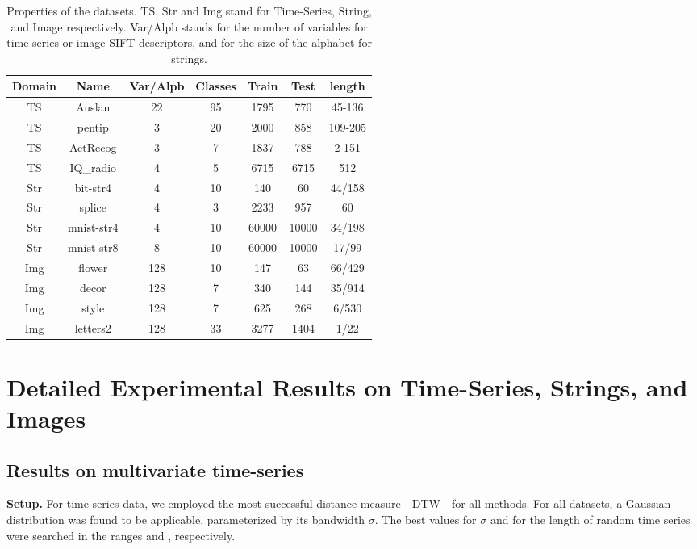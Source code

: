 \documentclass{article}
\newcommand{\1}{\mathbf{1}}
\begin{document}
\begin{table}[htbp]
\centering
\small
\caption{Properties of the datasets. TS, Str and Img stand for Time-Series, String, and Image respectively. Var/Alpb stands for the number of variables for time-series or image SIFT-descriptors, and for the size of the alphabet for strings. } 
\label{tb:info of datasets}
\vspace{-2mm}
\begin{center}
    \begin{tabular}{ c c c c c c c }
    \hline
    Domain & Name & Var/Alpb & Classes & Train & Test & length \\ \hline 
    TS & Auslan      & 22   & 95 & 1795 & 770 & 45-136  \\
    TS & pentip      & 3    & 20 & 2000 & 858	& 109-205  \\
    TS & ActRecog    & 3    & 7 & 1837 & 788 & 2-151 \\
    TS & IQ\_radio   & 4    & 5 & 6715 & 6715	& 512 \\ \hline
    Str & bit-str4   & 4    & 10 & 140 & 60	& 44/158  \\  
    Str & splice     & 4    & 3 & 2233 & 957 & 60  \\
    Str & mnist-str4 & 4    & 10 & 60000 & 10000 & 34/198 \\ 
    Str & mnist-str8 & 8    & 10 & 60000 & 10000 & 17/99 \\ \hline
    Img & flower     & 128  & 10 & 147 & 63 & 66/429 \\ 
    Img & decor      & 128  & 7 & 340 & 144 & 35/914 \\ 
    Img & style      & 128  & 7 & 625 &	268 & 6/530  \\
    Img & letters2 	 & 128  & 33 & 3277 & 1404 & 1/22 \\   \hline
    \end{tabular}
\end{center}
\vspace{-4mm}
\end{table}


\section{Detailed Experimental Results on Time-Series, Strings, and Images}
\label{App:Detailed Experimental Results on Time-Series, Strings, and Images}

\subsection{Results on multivariate time-series }
\label{App:Results on multivariate time-series}
\textbf{Setup.} For time-series data, we employed the most successful distance measure - DTW - for all methods. For all datasets, a Gaussian distribution was found to be applicable, parameterized by its bandwidth $\sigma$. The best values for $\sigma$ and for the length of random time series were searched in the ranges \text{[1e-3 1e3]} and \text{[2 50]}, respectively. 
\end{document}
